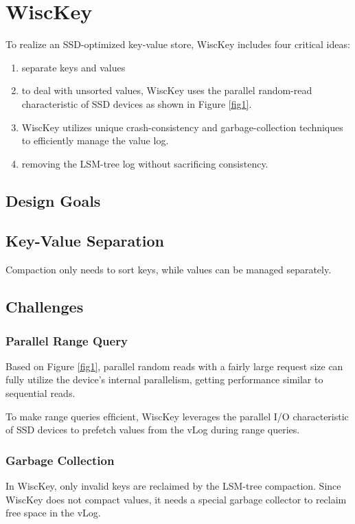 \documentclass[11pt]{article}
\begin{document}
\section{WiscKey}
\label{sec:org62a577e}
To realize an SSD-optimized key-value store, WiscKey includes four critical ideas:
\begin{enumerate}
\item separate keys and values
\item to deal with unsorted values, WiscKey uses the parallel random-read characteristic of SSD devices
as shown in Figure \ref{fig1}.
\item WiscKey utilizes unique crash-consistency and garbage-collection techniques to efficiently manage
the value log.
\item removing the LSM-tree log without sacrificing consistency.
\end{enumerate}
\subsection{Design Goals}
\label{sec:org11a6527}
\subsection{Key-Value Separation}
\label{sec:orgd892f13}
Compaction only needs to sort keys, while values can be managed separately.
\subsection{Challenges}
\label{sec:org8e192c8}
\subsubsection{Parallel Range Query}
\label{sec:org827951e}
Based on Figure \ref{fig1}, parallel random reads with a fairly large request size can fully utilize the
device's internal parallelism, getting performance similar to sequential reads.

To make range queries efﬁcient, WiscKey leverages the parallel I/O characteristic of SSD devices to
prefetch values from the vLog during range queries.
\subsubsection{Garbage Collection}
\label{sec:orgff1fe4e}
In WiscKey, only invalid keys are reclaimed by the LSM-tree compaction. Since WiscKey does not compact
values, it needs a special garbage collector to reclaim free space in the vLog.
\end{document}
